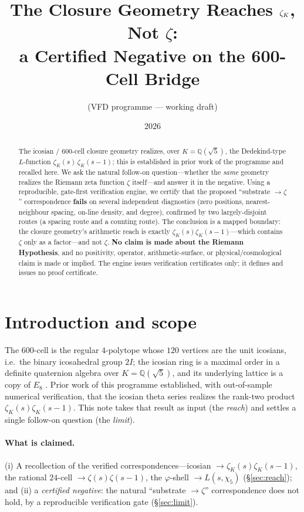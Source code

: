 \documentclass[11pt]{article}
\title{The Closure Geometry Reaches $\zetaK$, Not $\zeta$:\\
a Certified Negative on the 600-Cell Bridge}
\author{(VFD programme --- working draft)}
\date{2026}
\theoremstyle{definition}
\newcommand{\Q}{\mathbb{Q}}
\newcommand{\zetaK}{\zeta_{K}}
\begin{document}
\maketitle

\begin{abstract}
The icosian / $600$-cell closure geometry realizes, over $K=\Q(\sqrt5)$, the
Dedekind-type $L$-function $\zetaK(s)\,\zetaK(s-1)$; this is established in prior work
of the programme and recalled here. We ask the natural follow-on question---whether the
\emph{same} geometry realizes the Riemann zeta function $\zeta$ itself---and answer it
in the negative. Using a reproducible, gate-first verification engine, we certify that
the proposed ``substrate $\to\zeta$'' correspondence \textbf{fails} on several
independent diagnostics (zero positions, nearest-neighbour spacing, on-line density,
and degree), confirmed by two largely-disjoint routes (a spacing route and a counting
route). The conclusion is a mapped boundary: the closure geometry's arithmetic reach is
exactly $\zetaK(s)\zetaK(s-1)$---which contains $\zeta$ only as a factor---and not
$\zeta$. \textbf{No claim is made about the Riemann Hypothesis}, and no positivity,
operator, arithmetic-surface, or physical/cosmological claim is made or implied. The
engine issues verification certificates only; it defines and issues no proof
certificate.
\end{abstract}

\section{Introduction and scope}
The $600$-cell is the regular $4$-polytope whose $120$ vertices are the unit icosians,
i.e.\ the binary icosahedral group $2I$; the icosian ring is a maximal order in a
definite quaternion algebra over $K=\Q(\sqrt5)$, and its underlying lattice is a copy of
$E_8$ \cite{ConwaySloane}. Prior work of this programme \cite{IcosianTriad} established,
with out-of-sample numerical verification, that the icosian theta series realizes the
rank-two product $\zetaK(s)\zetaK(s-1)$. This note takes that result as input (the
\emph{reach}) and settles a single follow-on question (the \emph{limit}).

\paragraph{What is claimed.}
(i) A recollection of the verified correspondences---icosian $\to\zetaK(s)\zetaK(s-1)$,
the rational $24$-cell $\to\zeta(s)\zeta(s-1)$, the $\varphi$-shell $\to L(s,\chi_5)$
(\S\ref{sec:reach}); and (ii) a \emph{certified negative}: the natural
``substrate $\to\zeta$'' correspondence does not hold, by a reproducible verification
gate (\S\ref{sec:limit}).
\end{document}
